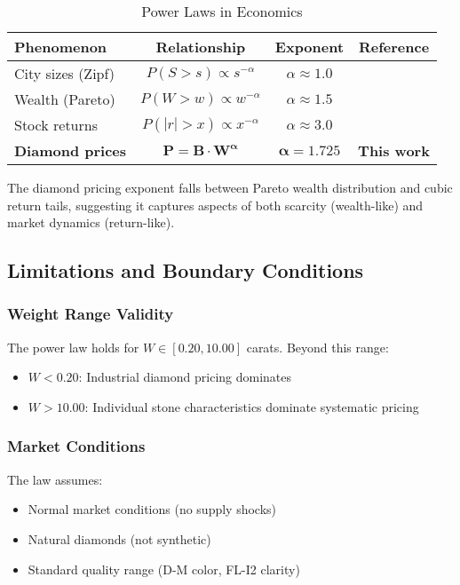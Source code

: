 \documentclass[12pt,a4paper]{article}
\theoremstyle{definition}
\theoremstyle{remark}
\begin{document}
\begin{table}[H]
\centering
\caption{Power Laws in Economics}
\label{tab:power_laws}
\begin{tabular}{@{}lccc@{}}
\toprule
\textbf{Phenomenon} & \textbf{Relationship} & \textbf{Exponent} & \textbf{Reference} \\
\midrule
City sizes (Zipf) & $P(S > s) \propto s^{-\alpha}$ & $\alpha \approx 1.0$ & \citet{gabaix1999zipf} \\
Wealth (Pareto) & $P(W > w) \propto w^{-\alpha}$ & $\alpha \approx 1.5$ & \citet{pareto1896} \\
Stock returns & $P(|r| > x) \propto x^{-\alpha}$ & $\alpha \approx 3.0$ & \citet{gopikrishnan1999scaling} \\

\textbf{Diamond prices} & $\mathbf{P = B \cdot W^{\alpha}}$ & $\boldsymbol{\alpha = 1.725}$ & \textbf{This work} \\
\bottomrule
\end{tabular}
\end{table}

The diamond pricing exponent falls between Pareto wealth distribution and cubic return tails, suggesting it captures aspects of both scarcity (wealth-like) and market dynamics (return-like).

\subsection{Limitations and Boundary Conditions}

\subsubsection{Weight Range Validity}
The power law holds for $W \in [0.20, 10.00]$ carats. Beyond this range:
\begin{itemize}
\item $W < 0.20$: Industrial diamond pricing dominates
\item $W > 10.00$: Individual stone characteristics dominate systematic pricing
\end{itemize}

\subsubsection{Market Conditions}
The law assumes:
\begin{itemize}
\item Normal market conditions (no supply shocks)
\item Natural diamonds (not synthetic)
\item Standard quality range (D-M color, FL-I2 clarity)
\end{itemize}
\end{document}
